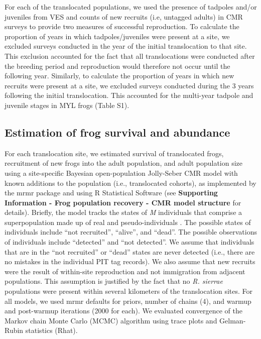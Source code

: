 \documentclass[9pt,twocolumn,twoside,lineno]{pnas-new}
\begin{document}
{For each of the translocated populations, we used the presence of
tadpoles and/or juveniles from VES and counts of new recruits (i.e,
untagged adults) in CMR surveys to provide two measures of successful
reproduction. To calculate the proportion of years in which
tadpoles/juveniles were present at a site, we excluded surveys conducted
in the year of the initial translocation to that site. This exclusion
accounted for the fact that all translocations were conducted after the
breeding period and reproduction would therefore not occur until the
following year. Similarly, to calculate the proportion of years in which
new recruits were present at a site, we excluded surveys conducted
during the 3 years following the initial translocation. This accounted
for the multi-year tadpole and juvenile stages in MYL frogs
(Table S1).

\hypertarget{estimation-of-frog-survival-and-abundance}{%
\subsection*{Estimation of frog survival and
abundance}\label{estimation-of-frog-survival-and-abundance}}

For each translocation site, we estimated survival of translocated
frogs, recruitment of new frogs into the adult population, and adult
population size using a site-specific Bayesian open-population
Jolly-Seber CMR model with known additions to the population (i.e.,
translocated cohorts), as implemented by the mrmr package
\citep{joseph2019} and using R Statistical Software
\citep[v4.4.4,][]{rsoftware2022} (see \textbf{Supporting Information -
Frog population recovery - CMR model structure} for details). Briefly,
the model tracks the states of \emph{M} individuals that comprise a
superpopulation made up of real and pseudo-individuals \citep[see][ for
details]{joseph2018}. The possible states of individuals include ``not
recruited'', ``alive'', and ``dead''. The possible observations of
individuals include ``detected'' and ``not detected''. We assume that
individuals that are in the ``not recruited'' or ``dead'' states are
never detected (i.e., there are no mistakes in the individual PIT tag
records). We also assume that new recruits were the result of
within-site reproduction and not immigration from adjacent populations.
This assumption is justified by the fact that no \emph{R. sierrae}
populations were present within several kilometers of the translocation
sites. For all models, we used mrmr defaults for priors, number of
chains (4), and warmup and post-warmup iterations (2000 for each). We
evaluated convergence of the Markov chain Monte Carlo (MCMC) algorithm
using trace plots and Gelman-Rubin statistics (Rhat).

}
\end{document}
